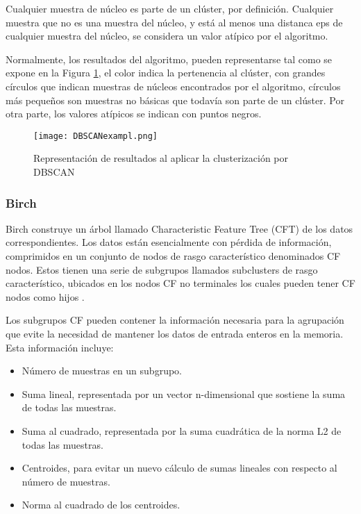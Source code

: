 Cualquier muestra de núcleo es parte de un clúster, por definición. Cualquier muestra que no es una muestra del núcleo, y está al menos una distanca eps de cualquier muestra del núcleo, se considera un valor atípico por el algoritmo.

Normalmente, los resultados del algoritmo, pueden representarse tal como se expone en la Figura  \ref{dbscanE}, el color indica la pertenencia al clúster, con grandes círculos que indican muestras de núcleos encontrados por el algoritmo, círculos más pequeños son muestras no básicas que todavía son parte de un clúster. Por otra parte, los valores atípicos se indican con puntos negros.

\begin{figure}[!h]
	\centering
	\texttt{[image: DBSCANexampl.png]}
	\caption{Representación de resultados al aplicar la clusterización por DBSCAN}
	\label{dbscanE}
\end{figure}

\subsubsection{Birch}

Birch construye un árbol llamado Characteristic Feature Tree (CFT) de los datos correspondientes. Los datos están esencialmente con pérdida de información, comprimidos en un conjunto de nodos de rasgo característico denominados CF nodos. Estos tienen una serie de subgrupos llamados subclusters de rasgo característico, ubicados en los nodos CF no terminales los cuales pueden tener CF nodos como hijos \cite{zhang1997birch}.

Los subgrupos CF pueden contener la información necesaria para la agrupación que evite la necesidad de mantener los datos de entrada enteros en la memoria. Esta información incluye:

\begin{itemize}
	
	
	\item Número de muestras en un subgrupo.
	\item Suma lineal, representada por un vector n-dimensional que sostiene la suma de todas las muestras.
	\item Suma al cuadrado, representada por la suma cuadrática de la norma L2 de todas las muestras.
	\item Centroides, para evitar un nuevo cálculo de sumas lineales con respecto al número de muestras.
	\item Norma al cuadrado de los centroides.
	
\end{itemize}

